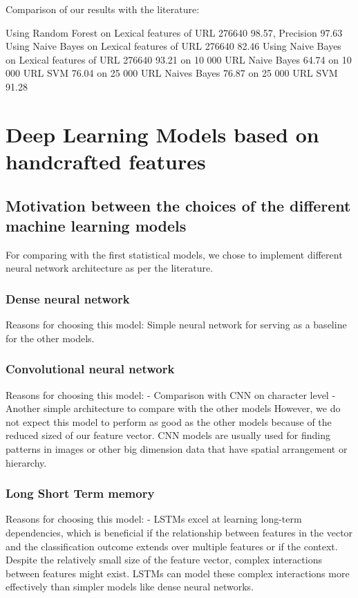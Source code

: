 \documentclass{article}
\begin{document}
    Comparison of our results with the literature:

    \cite{LexicalFeatureSelection} Using Random Forest on Lexical  features of URL 276640 98.57, Precision 97.63%
     \cite{LexicalFeatureSelection} Using Naive Bayes on Lexical  features of URL 276640 82.46
    \cite{LexicalFeatureSelection} Using Naive Bayes on Lexical  features of URL 276640 93.21
    \cite[]{PhishSafe} on 10 000 URL Naive Bayes 64.74
    \cite[]{PhishSafe} on 10 000 URL SVM 76.04
    \cite[]{PhishSafe} on 25 000 URL Naives Bayes 76.87
    \cite[]{PhishSafe} on 25 000 URL SVM 91.28
    
    \section{Deep Learning Models based on handcrafted features}\label{sec:deep-learning-models}
    
    \subsection{Motivation between the choices of the different machine learning models}\label{subsec:motivation-between-the-choices-of-the-different-machine-learning-models}
    For comparing with the first statistical models, we chose to implement different neural network architecture as per the literature.

    \subsubsection{Dense neural network}
    Reasons for choosing this model:
    Simple neural network for serving as a baseline for the other models.

    \subsubsection{Convolutional neural network}
    Reasons for choosing this model:
    - Comparison with CNN on character level
    - Another simple architecture to compare with the other models
    However, we do not expect this model to perform as good as the other models because of the reduced sized of our feature vector.
    CNN models are usually used for finding patterns in images or other big dimension data that have spatial arrangement or hierarchy.

    \subsubsection{Long Short Term memory}
    Reasons for choosing this model:
    - LSTMs excel at learning long-term dependencies, which is beneficial if the relationship between features in the vector and the classification outcome extends over multiple features or if the context.
    Despite the relatively small size of the feature vector, complex interactions between features might exist.
    LSTMs can model these complex interactions more effectively than simpler models like dense neural networks.
\end{document}
